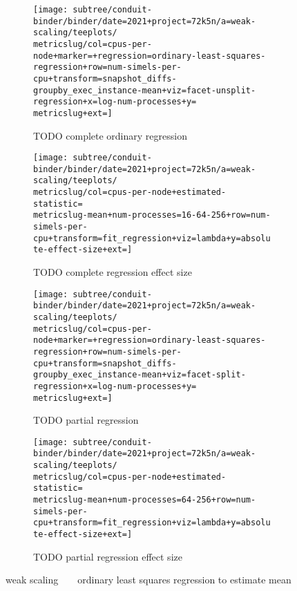 \begin{figure*}
  \centering

  \begin{subfigure}[b]{0.5\textwidth}
    \centering
    \texttt{[image: subtree/conduit-binder/binder/date=2021+project=72k5n/a=weak-scaling/teeplots/\\metricslug/col=cpus-per-node+marker=+regression=ordinary-least-squares-regression+row=num-simels-per-cpu+transform=snapshot\_diffs-groupby\_exec\_instance-mean+viz=facet-unsplit-regression+x=log-num-processes+y=\\metricslug+ext=]}
    \caption{TODO complete ordinary regression}
    \label{fig:weak-scaling-regression-ols-\metricslug-complete-regression}
  \end{subfigure}%
  \begin{subfigure}[b]{0.5\textwidth}
    \centering
    \texttt{[image: subtree/conduit-binder/binder/date=2021+project=72k5n/a=weak-scaling/teeplots/\\metricslug/col=cpus-per-node+estimated-statistic=\\metricslug-mean+num-processes=16-64-256+row=num-simels-per-cpu+transform=fit\_regression+viz=lambda+y=absolute-effect-size+ext=]}
    \caption{TODO complete regression effect size}
    \label{fig:weak-scaling-regression-ols-\metricslug-complete-effect-size}
  \end{subfigure}

  \begin{subfigure}[b]{0.5\textwidth}
    \centering
    \texttt{[image: subtree/conduit-binder/binder/date=2021+project=72k5n/a=weak-scaling/teeplots/\\metricslug/col=cpus-per-node+marker=+regression=ordinary-least-squares-regression+row=num-simels-per-cpu+transform=snapshot\_diffs-groupby\_exec\_instance-mean+viz=facet-split-regression+x=log-num-processes+y=\\metricslug+ext=]}
    \caption{TODO partial regression}
    \label{fig:weak-scaling-regression-ols-\metricslug-partial-regression}
  \end{subfigure}%
  \begin{subfigure}[b]{0.5\textwidth}
    \centering
    \texttt{[image: subtree/conduit-binder/binder/date=2021+project=72k5n/a=weak-scaling/teeplots/\\metricslug/col=cpus-per-node+estimated-statistic=\\metricslug-mean+num-processes=64-256+row=num-simels-per-cpu+transform=fit\_regression+viz=lambda+y=absolute-effect-size+ext=]}
    \caption{TODO partial regression effect size}
    \label{fig:weak-scaling-regression-ols-\metricslug-partial-effect-size}
  \end{subfigure}
  \caption{weak scaling ~ \metric ~ ordinary least squares regression to estimate mean}
  \label{fig:weak-scaling-regression-ols-\metricslug}
\end{figure*}
